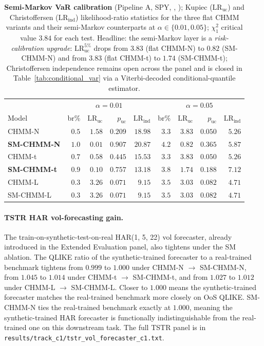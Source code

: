 \begin{table}[t]
\centering
\small
\caption{\textbf{Semi-Markov VaR calibration} (Pipeline A, SPY, , ); Kupiec ($\text{LR}_{\text{uc}}$) and Christoffersen ($\text{LR}_{\text{ind}}$) likelihood-ratio statistics for the three flat CHMM variants and their semi-Markov counterparts at $\alpha \in \{0.01, 0.05\}$; $\chi^2_1$ critical value $3.84$ for each test. Headline: the semi-Markov layer is a \emph{risk-calibration upgrade}: $\text{LR}_{\text{uc}}^{5\%}$ drops from $3.83$ (flat CHMM-N) to $0.82$ (SM-CHMM-N) and from $3.83$ (flat CHMM-t) to $1.74$ (SM-CHMM-t); Christoffersen independence remains open across the panel and is closed in Table~\ref{tab:conditional_var} via a Viterbi-decoded conditional-quantile estimator.}
\label{tab:sm_var}
\begin{tabular}{lrrrr|rrrr}
\toprule
 & \multicolumn{4}{c}{$\alpha = 0.01$} & \multicolumn{4}{c}{$\alpha = 0.05$} \\
Model & br\% & $\text{LR}_{\text{uc}}$ & $p_{\text{uc}}$ & $\text{LR}_{\text{ind}}$ & br\% & $\text{LR}_{\text{uc}}$ & $p_{\text{uc}}$ & $\text{LR}_{\text{ind}}$ \\
\midrule
CHMM-N       & $0.5$ & $1.58$ & $0.209$ & $18.98$ & $3.3$ & $3.83$ & $0.050$ & $5.26$ \\
\textbf{SM-CHMM-N} & $\mathbf{1.0}$ & $\mathbf{0.01}$ & $\mathbf{0.907}$ & $20.87$ & $\mathbf{4.2}$ & $\mathbf{0.82}$ & $\mathbf{0.365}$ & $5.87$ \\
CHMM-t       & $0.7$ & $0.58$ & $0.445$ & $15.53$ & $3.3$ & $3.83$ & $0.050$ & $5.26$ \\
\textbf{SM-CHMM-t} & $\mathbf{0.9}$ & $\mathbf{0.10}$ & $\mathbf{0.757}$ & $13.18$ & $\mathbf{3.8}$ & $\mathbf{1.74}$ & $\mathbf{0.188}$ & $7.12$ \\
CHMM-L       & $0.3$ & $3.26$ & $0.071$ & $\phantom{0}9.15$ & $3.5$ & $3.03$ & $0.082$ & $4.71$ \\
SM-CHMM-L    & $0.3$ & $3.26$ & $0.071$ & $\phantom{0}9.15$ & $3.5$ & $3.03$ & $0.082$ & $4.71$ \\
\bottomrule
\end{tabular}
\end{table}

\paragraph{TSTR HAR vol-forecasting gain.}
The train-on-synthetic-test-on-real HAR(1, 5, 22) vol forecaster, already introduced in the Extended Evaluation panel, also tightens under the SM ablation.
The QLIKE ratio of the synthetic-trained forecaster to a real-trained benchmark tightens from $0.999$ to $1.000$ under CHMM-N $\to$ SM-CHMM-N, from $1.045$ to $1.014$ under CHMM-t $\to$ SM-CHMM-t, and from $1.027$ to $1.012$ under CHMM-L $\to$ SM-CHMM-L.
Closer to $1.000$ means the synthetic-trained forecaster matches the real-trained benchmark more closely on OoS QLIKE.
SM-CHMM-N ties the real-trained benchmark exactly at $1.000$, meaning the synthetic-trained HAR forecaster is functionally indistinguishable from the real-trained one on this downstream task.
The full TSTR panel is in \texttt{results/track\_c1/tstr\_vol\_forecaster\_c1.txt}.

